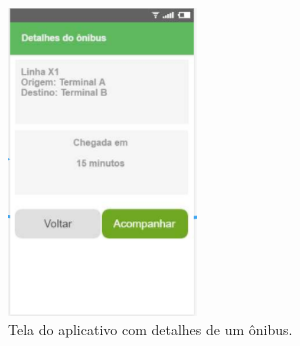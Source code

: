 \documentclass[
	12pt,				%
	oneside,			%
	a4paper,			%
	brazil				%
]{abntex2}
\begin{document}
{\newpage


\begin{figure}[!h]
\centering
\includegraphics[width=5cm, center]{images/tela-4-informacoes-do-onibus.PNG}
\caption{Tela do aplicativo com detalhes de um ônibus.}
\label{Rotulo}
\end{figure}

}
\end{document}
